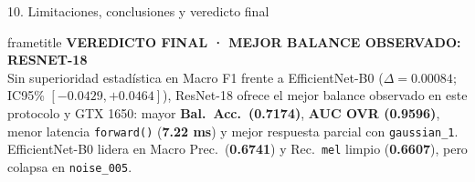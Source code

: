 \documentclass[aspectratio=169,10pt,xcolor=table]{beamer}
\begin{document}
\begin{frame}{10. Limitaciones, conclusiones y veredicto final}
  \vspace{0.20cm}
  \begin{beamercolorbox}[wd=\linewidth,sep=6pt]{frametitle}
    {\footnotesize\bfseries VEREDICTO FINAL · MEJOR BALANCE OBSERVADO: RESNET-18}\\[2pt]
    {\scriptsize Sin superioridad estadística en Macro F1 frente a EfficientNet-B0 ($\Delta=0.00084$; IC95\% $[-0.0429,+0.0464]$), ResNet-18 ofrece el mejor balance observado en este protocolo y GTX 1650: mayor \textbf{Bal.\ Acc.\ (0.7174)}, \textbf{AUC OVR (0.9596)}, menor latencia \texttt{forward()} (\textbf{7.22 ms}) y mejor respuesta parcial con \texttt{gaussian\_1}. EfficientNet-B0 lidera en Macro Prec.\ (\textbf{0.6741}) y Rec.\ \texttt{mel} limpio (\textbf{0.6607}), pero colapsa en \texttt{noise\_005}.}
  \end{beamercolorbox}
\end{frame}
\end{document}

